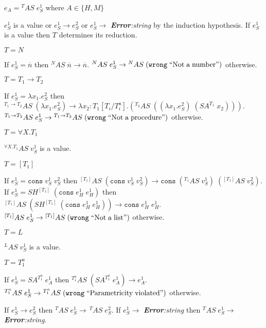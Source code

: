 \begin{case}
\label{as}
$e_{A}={^{T}A}S\;e_{S}^{1}$ where $A\in\lbrace H,M\rbrace$

$e_{S}^{1}$ is a value or $e_{S}^{1}\rightarrow e_{S}^{2}$ or $e_{S}^{1}\rightarrow$ \emph{\textbf{Error}:\;string} by the induction hypothesis.  If $e_{S}^{1}$ is a value then $T$ determines its reduction.
\begin{subcase}
$T=N$

If $e_{S}^{1}=\overline{n}$ then $^{N}AS\;\overline{n}\rightarrow\overline{n}$.  $^{N}AS\;e_{S}^{1}\rightarrow{^{N}A}S\;(\mathtt{wrong}\;\mathrm{``Not\;a\;number"})$ otherwise.
\end{subcase}
\begin{subcase}
$T=T_{1}\rightarrow T_{2}$

If $e_{S}^{1}=\lambda x_{1}.e_{S}^{2}$ then $^{T_{1}\rightarrow T_{2}}AS\;(\lambda x_{1}.e_{S}^{2})\rightarrow\lambda x_{2}:T_{1}[T_{i}/T^{a}_{i}].(^{T_{2}}AS\;((\lambda x_{1}.e_{S}^{2})\;(SA^{T_{1}}\;x_{2})))$.  $^{T_{1}\rightarrow T_{2}}AS\;e_{S}^{1}\rightarrow{^{T_{1}\rightarrow T_{2}}A}S\;(\mathtt{wrong}\;\mathrm{``Not\;a\;procedure"})$ otherwise.
\end{subcase}
\begin{subcase}
$T=\forall X.T_{1}$

$^{\forall X.T_{1}}AS\;v_{S}^{1}$ is a value.
\end{subcase}
\begin{subcase}
$T=[T_{1}]$

If $e_{S}^{1}=\mathtt{cons}\;v_{S}^{1}\;v_{S}^{2}$ then $^{[T_{1}]}AS\;(\mathtt{cons}\;v_{S}^{1}\;v_{S}^{2})\rightarrow\mathtt{cons}\;(^{T_{1}}AS\;v_{S}^{1})\;(^{[T_{1}]}AS\;v_{S}^{2})$.  If $e_{S}^{1}=SH^{[T_{1}]}\;(\mathtt{cons}\;e_{H}^{1}\;e_{H}^{1})$ then $^{[T_{1}]}AS\;(SH^{[T_{1}]}\;(\mathtt{cons}\;e_{H}^{1}\;e_{H}^{1}))\rightarrow\mathtt{cons}\;e_{H}^{1}\;e_{H}^{1}$.  $^{[T_{1}]}AS\;e_{S}^{1}\rightarrow{^{[T_{1}]}A}S\;(\mathtt{wrong}\;\mathrm{``Not\;a\;list"})$ otherwise.
\end{subcase}
\begin{subcase}
$T=L$

$^{L}AS\;v_{S}^{1}$ is a value.
\end{subcase}
\begin{subcase}
$T=T_{1}^{a}$

If $e_{S}^{1}=SA^{T_{1}^{a}}\;e_{A}^{1}$ then $^{T_{1}^{a}}AS\;(SA^{T_{1}^{a}}\;e_{A}^{1})\rightarrow e_{A}^{1}$.  $^{T_{1}^{a}}AS\;e_{S}^{1}\rightarrow{^{T_{1}^{a}}A}S\;(\mathtt{wrong}\;\mathrm{``Parametricity\;violated"})$ otherwise.
\end{subcase}
If $e_{S}^{1}\rightarrow e_{S}^{2}$ then $^{T}AS\;e_{S}^{1}\rightarrow\,^{T}AS\;e_{S}^{2}$.  If $e_{S}^{1}\rightarrow$ \emph{\textbf{Error}:\;string} then $^{T}AS\;e_{S}^{1}\rightarrow$ \emph{\textbf{Error}:\;string}.
\end{case}